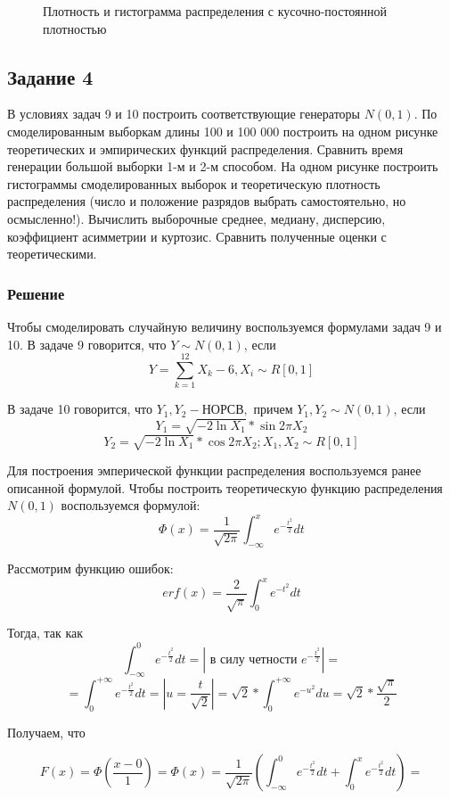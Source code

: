 \documentclass{article}
\begin{document}
\begin{figure}[h]
{}
\caption{Плотность и гистограмма распределения с кусочно-постоянной плотностью}
\label{fig:image}
\end{figure}

\subsection{Задание 4}
В условиях задач 9 и 10 построить соответствующие генераторы $N(0,1)$. По смоделированным выборкам длины 
100 и 100 000 построить на одном рисунке теоретических и эмпирических функций распределения. Сравнить 
время генерации большой выборки 1-м и 2-м способом. На одном рисунке построить гистограммы смоделированных
 выборок и теоретическую плотность распределения (число и положение разрядов выбрать 
самостоятельно, но осмысленно!). Вычислить выборочные среднее, медиану, дисперсию, коэффициент 
асимметрии и куртозис. Сравнить полученные оценки с теоретическими. 

\subsubsection{Решение}
Чтобы смоделировать случайную величину воспользуемся формулами задач 9 и 10. В задаче 9 говорится, что 
$Y \sim N(0, 1)$, если 
\[Y = \sum_{k = 1}^{12}X_k - 6, X_i \sim R[0, 1]\]

В задаче 10 говорится, что $Y_1, Y_2 - \text{НОРСВ}, \text{ причем } Y_1, Y_2 \sim N(0, 1)$, если 
\[Y_1 = \sqrt{-2\ln{X_1}}*\sin{2\pi X_2}\]
\[Y_2 = \sqrt{-2\ln{X_1}}*\cos{2\pi X_2}; X_1, X_2 \sim R[0, 1]\]

Для построения эмперической функции распределения воспользуемся ранее описанной формулой. Чтобы построить теоретическую функцию распределения $N(0, 1)$ воспользуемся формулой:
\[\Phi(x) = \frac{1}{\sqrt{2\pi}}\int_{-\infty}^{x}e^{-\frac{t^2}{2}}dt\]

Рассмотрим функцию ошибок:
\[erf(x) = \frac{2}{\sqrt{\pi}}\int_{0}^{x}e^{-t^2}dt\]

Тогда, так как 
\[\int_{-\infty}^{0}e^{-\frac{t^2}{2}}dt = \left|\text{ в силу четности } e^{-\frac{t^2}{2}}\right| = \] 
\[=\int_{0}^{+\infty}e^{-\frac{t^2}{2}}dt = \left|u = \frac{t}{\sqrt{2}}\right| = 
\sqrt{2}*\int_{0}^{+\infty}e^{-u^2}du = \sqrt{2}*\frac{\sqrt{\pi}}{2}\]

Получаем, что 

\[F(x) = \Phi(\frac{x-0}{1}) = \Phi(x) = \frac{1}{\sqrt{2\pi}}\left(\int_{-\infty}^{0}e^{-\frac{t^2}{2}}dt + \int_{0}^{x}e^{-\frac{t^2}{2}}dt\right) = \]
\end{document}
